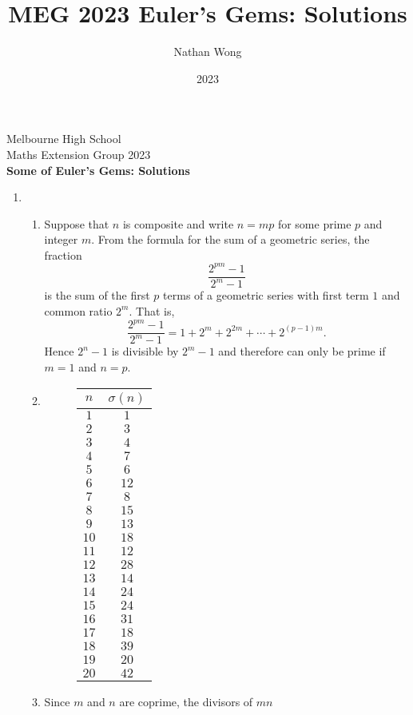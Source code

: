 \documentclass[a4paper,10pt]{article}
\title{MEG 2023 Euler's Gems: Solutions}
\author{Nathan Wong}
\date{2023}
\newcommand{\thetitle}{Some of Euler's Gems: Solutions}
\begin{document}
\noindent Melbourne High School\\
Maths Extension Group 2023\\
\textbf{\thetitle}\\
\begin{enumerate}
\item \begin{enumerate}
\item Suppose that \(n\) is composite and write \(n=mp\) for some prime \(p\) and integer \(m\). From the formula
  for the sum of a geometric series, the fraction \[\frac{2^{pm}-1}{2^m-1}\] is the sum of the first \(p\) terms of a geometric series
  with first term \(1\) and common ratio \(2^m\). That is, \[\frac{2^{pm}-1}{2^m-1}=1+2^m+2^{2m}+\cdots+2^{(p-1)m}.\] Hence \(2^n-1\) is divisible
  by \(2^m-1\) and therefore can only be prime if \(m=1\) and \(n=p\).
\item
  \begin{figure}[h]
\begin{center}
    \begin{tabular}{|c|c|}
      \hline\(n\)&\(\sigma(n)\)\\
      \hline
       \(1\)&\(1\)\\
       \(2\)&\(3\)\\
      \(3\)&\(4\)\\
      \(4\)&\(7\)\\
      \(5\)&\(6\)\\
      \(6\)&\(12\)\\
      \(7\)&\(8\)\\
      \(8\)&\(15\)\\
      \(9\)&\(13\)\\
      \(10\)&\(18\)\\
      \(11\)&\(12\)\\
      \(12\)&\(28\)\\
      \(13\)&\(14\)\\
      \(14\)&\(24\)\\
      \(15\)&\(24\)\\
      \(16\)&\(31\)\\
      \(17\)&\(18\)\\
      \(18\)&\(39\)\\
      \(19\)&\(20\)\\
      \(20\)&\(42\)\\
      \hline
    \end{tabular}
  \end{center}
  \end{figure}
\item Since \(m\) and \(n\) are coprime, the divisors of \(mn\)

\end{enumerate}
\end{enumerate}
\end{document}
